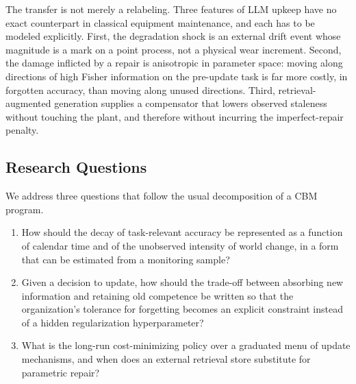 \documentclass[journal]{IEEEtran}
\begin{document}
The transfer is not merely a relabeling. Three features of LLM upkeep have no exact counterpart in classical equipment maintenance, and each has to be modeled explicitly. First, the degradation shock is an external drift event whose magnitude is a mark on a point process, not a physical wear increment. Second, the damage inflicted by a repair is anisotropic in parameter space: moving along directions of high Fisher information on the pre-update task is far more costly, in forgotten accuracy, than moving along unused directions. Third, retrieval-augmented generation supplies a compensator that lowers observed staleness without touching the plant, and therefore without incurring the imperfect-repair penalty.

\subsection{Research Questions}
We address three questions that follow the usual decomposition of a CBM program.
\begin{enumerate}
\item How should the decay of task-relevant accuracy be represented as a function of calendar time and of the unobserved intensity of world change, in a form that can be estimated from a monitoring sample?
\item Given a decision to update, how should the trade-off between absorbing new information and retaining old competence be written so that the organization's tolerance for forgetting becomes an explicit constraint instead of a hidden regularization hyperparameter?
\item What is the long-run cost-minimizing policy over a graduated menu of update mechanisms, and when does an external retrieval store substitute for parametric repair?
\end{enumerate}
\end{document}
